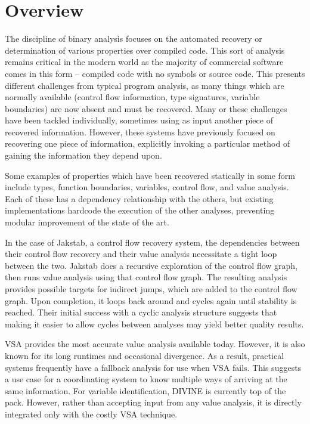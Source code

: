 
\section{Overview}
\label{sec:overview}
The discipline of binary analysis focuses on the automated recovery or determination of various properties over compiled code.
This sort of analysis remains critical in the modern world as the majority of commercial software comes in this form -- compiled code with no symbols or source code.
This presents different challenges from typical program analysis, as many things which are normally available (control flow information, type signatures, variable boundaries) are now absent and must be recovered.
Many or these challenges have been tackled individually, sometimes using as input another piece of recovered information.
However, these systems have previously focused on recovering one piece of information, explicitly invoking a particular method of gaining the information they depend upon.

Some examples of properties which have been recovered statically in some form include types, function boundaries, variables, control flow, and value analysis.
Each of these has a dependency relationship with the others, but existing implementations hardcode the execution of the other analyses, preventing modular improvement of the state of the art.

In the case of Jakstab\cite{jakstab}, a control flow recovery system, the dependencies between their control flow recovery and their value analysis necessitate a tight loop between the two.
Jakstab does a recursive exploration of the control flow graph, then runs value analysis using that control flow graph.
The resulting analysis provides possible targets for indirect jumps, which are added to the control flow graph.
Upon completion, it loops back around and cycles again until stability is reached.
Their initial success with a cyclic analysis structure suggests that making it easier to allow cycles between analyses may yield better quality results.

VSA\cite{vsa} provides the most accurate value analysis available today. However, it is also known for its long runtimes and occasional divergence.
As a result, practical systems frequently have a fallback analysis for use when VSA fails.
This suggests a use case for a coordinating system to know multiple ways of arriving at the same information.
For variable identification, DIVINE\cite{divine} is currently top of the pack.
However, rather than accepting input from any value analysis, it is directly integrated only with the costly VSA technique.

